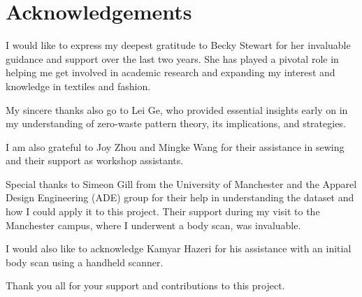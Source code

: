 \chapter*{Acknowledgements}
I would like to express my deepest gratitude to Becky Stewart for her invaluable guidance and support over the last two years. She has played a pivotal role in helping me get involved in academic research and expanding my interest and knowledge in textiles and fashion.

My sincere thanks also go to Lei Ge, who provided essential insights early on in my understanding of zero-waste pattern theory, its implications, and strategies.

I am also grateful to Joy Zhou and Mingke Wang for their assistance in sewing and their support as workshop assistants.

Special thanks to Simeon Gill from the University of Manchester and the Apparel Design Engineering (ADE) group for their help in understanding the dataset and how I could apply it to this project. Their support during my visit to the Manchester campus, where I underwent a body scan, was invaluable.

I would also like to acknowledge Kamyar Hazeri for his assistance with an initial body scan using a handheld scanner.

Thank you all for your support and contributions to this project.